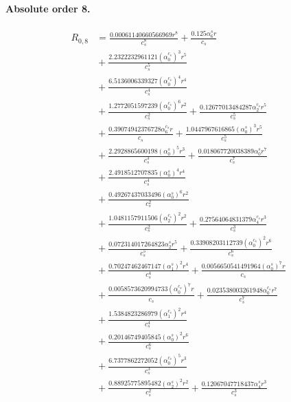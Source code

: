 \documentclass[10pt]{article}
\begin{document}
\paragraph{Absolute order 8.}
\begin{align*}
R_{0,8} &= \frac{0.00061140660566969 r^{8}}{c_{s}^{8}} + \frac{0.125 \alpha_{6}^s r}{c_{s}} \\
&{}  + \frac{2.2322232961121 \left(\alpha_{0}^{c_s}\right)^{3} r^{5}}{c_{s}^{5}} \\
&{}  + \frac{6.5136006339327 \left(\alpha_{0}^{c_s}\right)^{4} r^{4}}{c_{s}^{4}} \\
&{}  + \frac{1.2772051597239 \left(\alpha_{0}^{c_s}\right)^{6} r^{2}}{c_{s}^{2}} + \frac{0.12677013484287 \alpha_{2}^{c_s} r^{5}}{c_{s}^{5}} \\
&{}  + \frac{0.39074942376728 \alpha_{6}^{c_s} r}{c_{s}} + \frac{1.0447967616865 \left(\alpha_{0}^s\right)^{3} r^{5}}{c_{s}^{5}} \\
&{}  + \frac{2.2928865600198 \left(\alpha_{0}^s\right)^{5} r^{3}}{c_{s}^{3}} + \frac{0.018067720038389 \alpha_{0}^s r^{7}}{c_{s}^{7}} \\
&{}  + \frac{2.4918512707835 \left(\alpha_{0}^s\right)^{4} r^{4}}{c_{s}^{4}} \\
&{}  + \frac{0.49267437033496 \left(\alpha_{0}^s\right)^{6} r^{2}}{c_{s}^{2}} \\
&{}  + \frac{1.0481157911506 \left(\alpha_{2}^{c_s}\right)^{2} r^{2}}{c_{s}^{2}} + \frac{0.27564064831379 \alpha_{4}^{c_s} r^{3}}{c_{s}^{3}} \\
&{}  + \frac{0.072314017264823 \alpha_{2}^s r^{5}}{c_{s}^{5}} + \frac{0.33908203112739 \left(\alpha_{0}^{c_s}\right)^{2} r^{6}}{c_{s}^{6}} \\
&{}  + \frac{0.70247462467147 \left(\alpha_{1}^s\right)^{2} r^{4}}{c_{s}^{4}} + \frac{0.0056650541491964 \left(\alpha_{0}^s\right)^{7} r}{c_{s}} \\
&{}  + \frac{0.0058573620994733 \left(\alpha_{0}^{c_s}\right)^{7} r}{c_{s}} + \frac{0.023538003261948 \alpha_{0}^{c_s} r^{7}}{c_{s}^{7}} \\
&{}  + \frac{1.5384823286979 \left(\alpha_{1}^{c_s}\right)^{2} r^{4}}{c_{s}^{4}} \\
&{}  + \frac{0.20146749405845 \left(\alpha_{0}^s\right)^{2} r^{6}}{c_{s}^{6}} \\
&{}  + \frac{6.7377862272052 \left(\alpha_{0}^{c_s}\right)^{5} r^{3}}{c_{s}^{3}} \\
&{}  + \frac{0.88925775895482 \left(\alpha_{2}^s\right)^{2} r^{2}}{c_{s}^{2}} + \frac{0.12067047718437 \alpha_{4}^s r^{3}}{c_{s}^{3}} \\

\end{align*}
\end{document}
